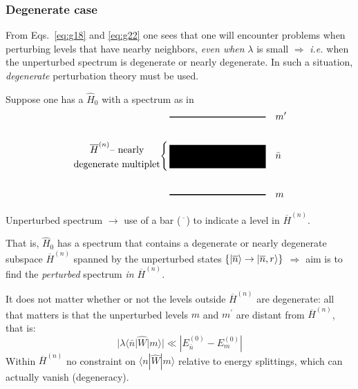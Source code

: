 \documentclass[12pt]{article}
\newcommand{\be}{\begin{equation}}
\newcommand{\ee}{\end{equation}}
\begin{document}


\subsubsection{Degenerate case}

From Eqs.~\eqref{eq:g18} and \eqref{eq:g22} one sees that one will
encounter problems when perturbing levels
that have nearby neighbors, \emph{even when} $\lambda$ is small
$\Rightarrow$ \textit{i.e.} when the unperturbed spectrum
is degenerate or nearly degenerate.
In such a situation, \emph{degenerate} perturbation
theory must be used.

Suppose one has a $\hat{H}_0$ with a spectrum as in
\[
\begin{aligned}
&\,\text{\rule[0.5ex]{10em}{1pt}}\quad m^\prime\\
\\
%
\left.%
\begin{gathered}
\overline{H}^{(n)}\text{-- nearly}\\
\text{degenerate multiplet}
\end{gathered}
\right\{
%
&\,\text{\rule[-10pt]{10em}{24pt}}\quad \bar{n}\\
\\
&\,\text{\rule[0.5ex]{10em}{1pt}}\quad m
\end{aligned}
\]

Unperturbed spectrum $\to$ 
use of a bar ($\overline{\phantom{x}}$)
to indicate a level in $\overline{H}^{(n)}$.

That is, $\hat{H}_0$ has a spectrum that contains a
degenerate or nearly degenerate subspace $\overline{H}^{(n)}$ spanned
by the unperturbed states $\{\ket{\overline{n}} \to \ket{\overline{n},r} \}$
$\Rightarrow$ aim is to find the \emph{perturbed} spectrum \emph{in $\overline{H}^{(n)}$.}


It does not matter whether or not the levels outside
$\overline{H}^{(n)}$ are degenerate: all that matters is that the
unperturbed levels $m$ and $m^\prime$ are distant from
$\overline{H}^{(n)}$, that is: %
\setcounter{equation}{24} %
\be
|\lambda\langle\bar{n}|\hat{W}| m\rangle| \ll \left|E_{\bar{n}}^{(0)}-E_{m}^{(0)}\right|
\ee
Within $\overline{H}^{(n)}$ no constraint on $\langle n|\hat{W}| m\rangle$
relative to energy splittings, which can actually
vanish (degeneracy).
\end{document}
